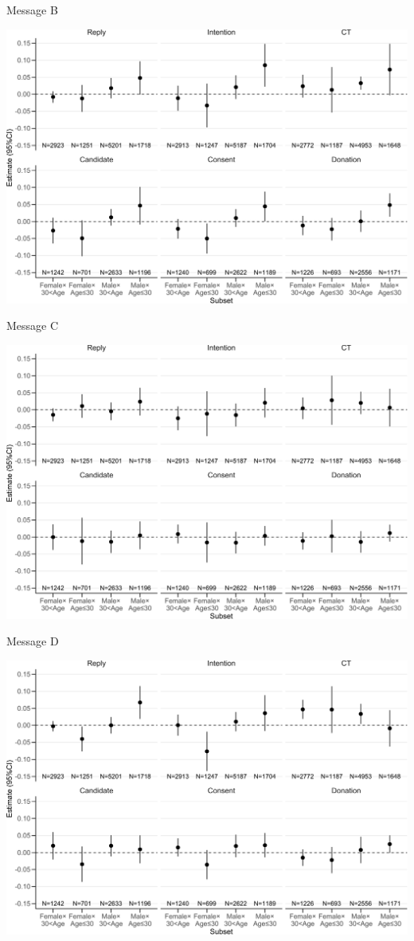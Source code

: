 \documentclass[
      aspectratio=169,
        12pt,
    ]{beamer}
\begin{document}
\begin{frame}{Message B}
\protect\hypertarget{message-b}{}
\begin{center}\includegraphics[width=0.75\linewidth]{report_files/figure-beamer/plotB-hetero-gender-age-primaries-1} \end{center}
\end{frame}

\begin{frame}{Message C}
\protect\hypertarget{message-c}{}
\begin{center}\includegraphics[width=0.75\linewidth]{report_files/figure-beamer/plotC-hetero-gender-age-primaries-1} \end{center}
\end{frame}

\begin{frame}{Message D}
\protect\hypertarget{message-d}{}
\begin{center}\includegraphics[width=0.75\linewidth]{report_files/figure-beamer/plotD-hetero-gender-age-primaries-1} \end{center}
\end{frame}
\end{document}
